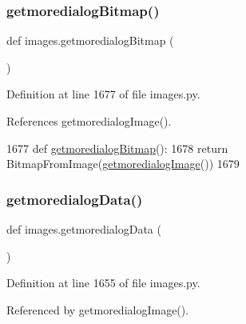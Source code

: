 \subsubsection{\texorpdfstring{getmoredialog\+Bitmap()}{getmoredialogBitmap()}}
{\footnotesize\ttfamily def images.\+getmoredialog\+Bitmap (\begin{DoxyParamCaption}{ }\end{DoxyParamCaption})}



Definition at line 1677 of file images.\+py.



References getmoredialog\+Image().


\begin{DoxyCode}
1677 \textcolor{keyword}{def }\hyperlink{namespaceimages_add10ebe4b5b0704d2b1672509e931db3}{getmoredialogBitmap}():
1678     \textcolor{keywordflow}{return} BitmapFromImage(\hyperlink{namespaceimages_a6470d924bdc02d97c2371afebd4c5d62}{getmoredialogImage}())
1679 
\end{DoxyCode}
\mbox{\label{namespaceimages_a78cb338a47bd555e7036963d52cd7412}} 
\subsubsection{\texorpdfstring{getmoredialog\+Data()}{getmoredialogData()}}
{\footnotesize\ttfamily def images.\+getmoredialog\+Data (\begin{DoxyParamCaption}{ }\end{DoxyParamCaption})}



Definition at line 1655 of file images.\+py.



Referenced by getmoredialog\+Image().



